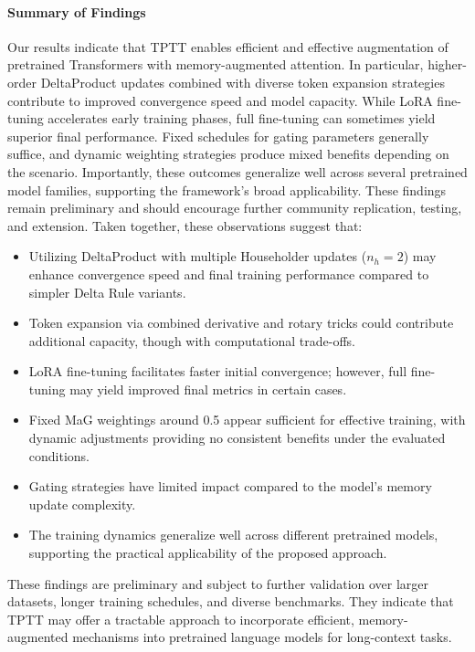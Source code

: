 \documentclass[10pt,a4paper]{article}
\begin{document}
\paragraph{Summary of Findings}  
Our results indicate that TPTT enables efficient and effective augmentation of pretrained Transformers with memory-augmented attention. In particular, higher-order DeltaProduct updates combined with diverse token expansion strategies contribute to improved convergence speed and model capacity. While LoRA fine-tuning accelerates early training phases, full fine-tuning can sometimes yield superior final performance. Fixed schedules for gating parameters generally suffice, and dynamic weighting strategies produce mixed benefits depending on the scenario. Importantly, these outcomes generalize well across several pretrained model families, supporting the framework’s broad applicability. These findings remain preliminary and should encourage further community replication, testing, and extension. Taken together, these observations suggest that:

\begin{itemize}
    \item Utilizing DeltaProduct with multiple Householder updates (\(n_h=2\)) may enhance convergence speed and final training performance compared to simpler Delta Rule variants.
    \item Token expansion via combined derivative and rotary tricks could contribute additional capacity, though with computational trade-offs.
    \item LoRA fine-tuning facilitates faster initial convergence; however, full fine-tuning may yield improved final metrics in certain cases.
    \item Fixed MaG weightings around 0.5 appear sufficient for effective training, with dynamic adjustments providing no consistent benefits under the evaluated conditions.
    \item Gating strategies have limited impact compared to the model’s memory update complexity.
    \item The training dynamics generalize well across different pretrained models, supporting the practical applicability of the proposed approach.
\end{itemize}

These findings are preliminary and subject to further validation over larger datasets, longer training schedules, and diverse benchmarks. They indicate that TPTT may offer a tractable approach to incorporate efficient, memory-augmented mechanisms into pretrained language models for long-context tasks.
\end{document}
